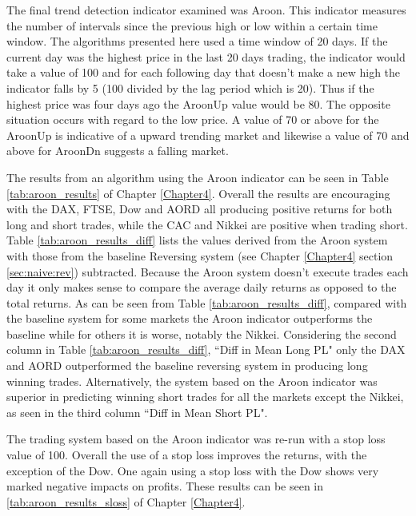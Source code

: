 The final trend detection indicator examined was Aroon.  This indicator measures the number of intervals since the previous high or low within a certain time window. The algorithms presented here used a time window of 20 days. If the current day was the highest price in the last 20 days trading, the indicator would take a value of 100 and for each following day that doesn't make a new high the indicator falls by 5 (100 divided by the lag period which is 20).  Thus if the highest price was four days ago the AroonUp value would be 80. The opposite situation occurs with regard to the low price. A value of 70 or above for the AroonUp is indicative of a upward trending market and likewise a value of 70 and above for AroonDn suggests a falling market.

The results from an algorithm using the Aroon indicator can be seen in Table \ref{tab:aroon_results} of Chapter \ref{Chapter4}. Overall the results are encouraging with the DAX, FTSE, Dow and AORD all producing positive returns for both long and short trades, while the CAC and Nikkei are positive when trading short. Table \ref{tab:aroon_results_diff} lists the values derived from the Aroon system with those from the baseline Reversing system (see Chapter \ref{Chapter4} section \ref{sec:naive:rev}) subtracted. Because the Aroon system doesn't execute trades each day it only makes sense to compare the average daily returns as opposed to the total returns. As can be seen from  Table \ref{tab:aroon_results_diff}, compared with the baseline system for some markets the Aroon indicator outperforms the baseline while for others it is worse, notably the Nikkei. Considering the second column in Table \ref{tab:aroon_results_diff}, \textquotedblleft Diff in Mean Long PL" only the DAX and AORD outperformed the baseline reversing system in producing long winning trades. Alternatively, the system based on the Aroon indicator was superior in predicting winning short trades for all the markets except the Nikkei, as seen in the third column \textquotedblleft Diff in Mean Short PL".



The trading system based on the Aroon indicator was re-run with a stop loss value of 100. Overall the use of a stop loss improves the returns, with the exception of the Dow. One again using a stop loss with the Dow shows very marked negative impacts on profits. These results can be seen in \ref{tab:aroon_results_sloss} of Chapter \ref{Chapter4}.

